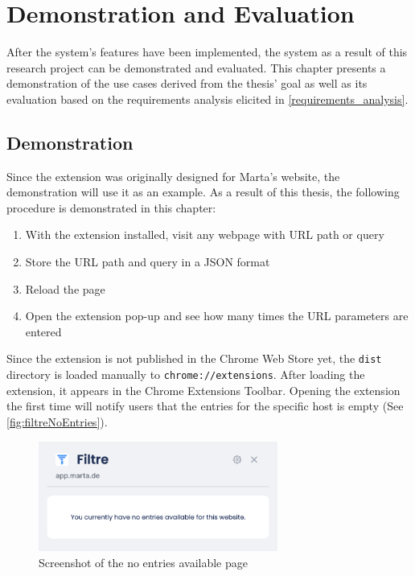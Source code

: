 \newpage
\chapter{Demonstration and Evaluation}
After the system's features have been implemented, the system as a result of this research project can be demonstrated and evaluated. This chapter presents a demonstration of the use cases derived from the thesis' goal as well as its evaluation based on the requirements analysis elicited in \autoref{requirements_analysis}.

\section{Demonstration}
Since the extension was originally designed for Marta's website, the demonstration will use it as an example. As a result of this thesis, the following procedure is demonstrated in this chapter:

\begin{enumerate}
  \item With the extension installed, visit any webpage with URL path or query
  \item Store the URL path and query in a JSON format
  \item Reload the page
  \item Open the extension pop-up and see how many times the URL parameters are entered
\end{enumerate}

Since the extension is not published in the Chrome Web Store yet, the \texttt{dist} directory is loaded manually to \verb;chrome://extensions;. After loading the extension, it appears in the Chrome Extensions Toolbar. Opening the extension the first time will notify users that the entries for the specific host is empty (See \autoref{fig:filtreNoEntries}).

\begin{figure}[H]
  \centering
  \includegraphics[width=0.7\textwidth]{assets/Filtre_no_entries.png}
  \caption{Screenshot of the no entries available page}
  \label{fig:filtreNoEntries}
\end{figure}

